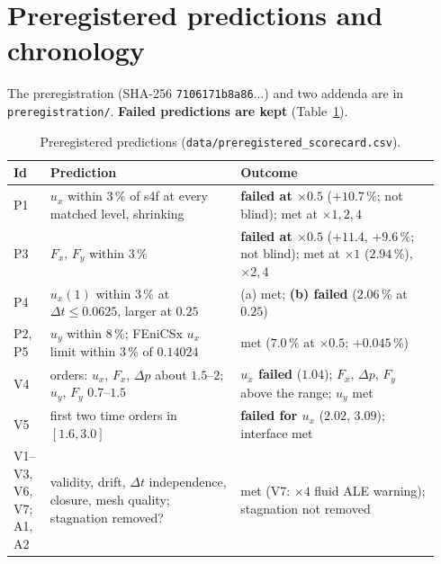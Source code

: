 \documentclass[sn-mathphys,Numbered]{sn-jnl}
\newcommand{\FE}{FEniCSx}
\begin{document}
\section{Preregistered predictions and chronology}\label{sec:nh_prereg}
The preregistration (SHA-256 \texttt{7106171b8a86}$\ldots$) and two addenda are in \texttt{preregistration/}. \textbf{Failed predictions are kept} (Table~\ref{tab:nh_prereg}).

\begin{table}[!ht]
\centering
\caption{Preregistered predictions (\texttt{data/preregistered\_scorecard.csv}).}\label{tab:nh_prereg}
\footnotesize
\begin{tabular}{@{}p{0.08\linewidth}p{0.42\linewidth}p{0.44\linewidth}@{}}
\toprule
Id & Prediction & Outcome \\
\midrule
P1 & $u_x$ within $3\,\%$ of s4f at every matched level, shrinking & \textbf{failed at $\times0.5$} ($+10.7\,\%$; not blind); met at $\times1,2,4$ \\
P3 & $F_x$, $F_y$ within $3\,\%$ & \textbf{failed at $\times0.5$} ($+11.4$, $+9.6\,\%$; not blind); met at $\times1$ ($2.94\,\%$), $\times2,4$ \\
P4 & $u_x(1)$ within $3\,\%$ at $\Delta t\le0.0625$, larger at $0.25$ & (a) met; \textbf{(b) failed} ($2.06\,\%$ at $0.25$) \\
P2, P5 & $u_y$ within $8\,\%$; \FE{} $u_x$ limit within $3\,\%$ of $0.14024$ & met ($7.0\,\%$ at $\times0.5$; $+0.045\,\%$) \\
V4 & orders: $u_x$, $F_x$, $\Delta p$ about $1.5$--$2$; $u_y$, $F_y$ $0.7$--$1.5$ & \textbf{$u_x$ failed} ($1.04$); $F_x$, $\Delta p$, $F_y$ above the range; $u_y$ met \\
V5 & first two time orders in $[1.6,3.0]$ & \textbf{failed for $u_x$} ($2.02$, $3.09$); interface met \\
V1--V3, V6, V7; A1, A2 & validity, drift, $\Delta t$ independence, closure, mesh quality; stagnation removed? & met (V7: $\times4$ fluid ALE warning); stagnation not removed \\
\bottomrule
\end{tabular}
\end{table}
\end{document}
